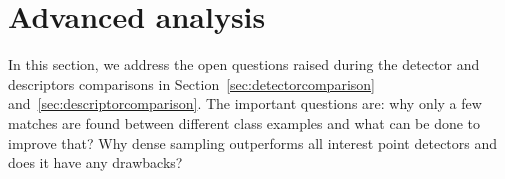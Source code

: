 \documentclass[journal]{IEEEtran}
\begin{document}
%

%
\section{Advanced analysis}
%
In this section, we address the open questions raised during the
detector and descriptors comparisons in Section~\ref{sec:detectorcomparison}
and~\ref{sec:descriptorcomparison}. The important
questions are: why only a few matches are found between different class
examples and what can be done to improve that? Why dense sampling outperforms
all interest point detectors and does it have any drawbacks?
\end{document}
